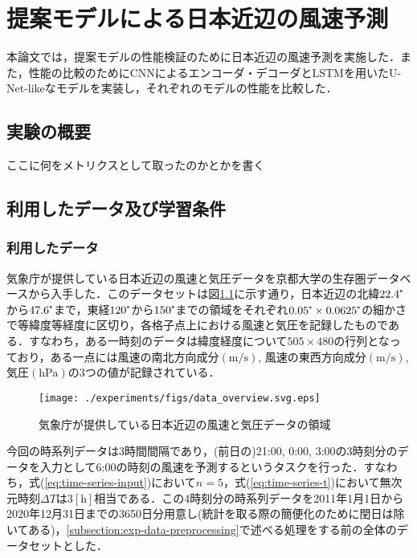 \chapter{提案モデルによる日本近辺の風速予測\label{chap:experiments}}
本論文では，提案モデルの性能検証のために日本近辺の風速予測を実施した．また，性能の比較のためにCNNによるエンコーダ・デコーダとLSTMを用いたU-Net-likeなモデルを実装し，それぞれのモデルの性能を比較した．

\section{実験の概要 \label{section:exp-overview}}
ここに何をメトリクスとして取ったのかとかを書く

\section{利用したデータ及び学習条件 \label{section:exp-data-and-condition}}
\subsection{利用したデータ \label{subsection:exp-data}}
気象庁が提供している日本近辺の風速と気圧データを京都大学の生存圏データベース\cite{Seizonken2004}から入手した．このデータセットは図\ref{fig:exp-data-overview}に示す通り，日本近辺の北緯$22.4\tcdegree$から$47.6\tcdegree$まで，東経$120\tcdegree$から$150\tcdegree$までの領域をそれぞれ$0.05\tcdegree \times 0.0625\tcdegree$の細かさで等緯度等経度に区切り，各格子点上における風速と気圧を記録したものである\cite{JMBSC2022}．すなわち，ある一時刻のデータは緯度経度について$505 \times 480$の行列となっており，ある一点には風速の南北方向成分$(\mathrm{m/s})$, 風速の東西方向成分$(\mathrm{m/s})$, 気圧$(\mathrm{hPa})$の3つの値が記録されている．
\begin{figure}[bp]
  \centering
  \texttt{[image: ./experiments/figs/data\_overview.svg.eps]}
  \caption{気象庁が提供している日本近辺の風速と気圧データの領域}
  \label{fig:exp-data-overview}
\end{figure}

今回の時系列データは3時間間隔であり，(前日の)21:00, 0:00, 3:00の3時刻分のデータを入力として6:00の時刻の風速を予測するというタスクを行った．すなわち，式(\ref{eq:time-series-input})において$n=5$，式(\ref{eq:time-series-t})において無次元時刻$\Delta T$は$3[\mathrm{h}]$相当である．この4時刻分の時系列データを2011年1月1日から2020年12月31日までの3650日分用意し(統計を取る際の簡便化のために閏日は除いてある)，\ref{subsection:exp-data-preprocessing}で述べる処理をする前の全体のデータセットとした．

